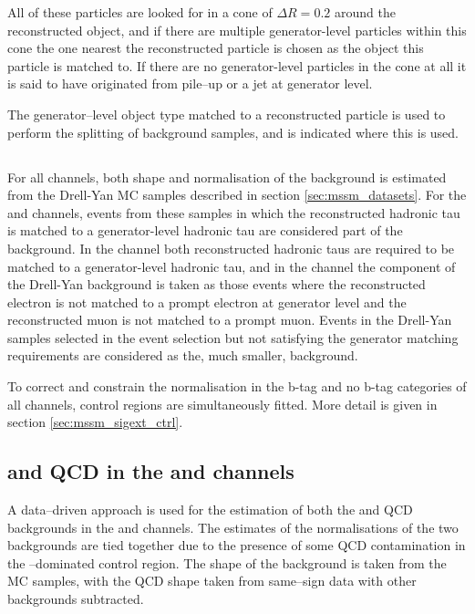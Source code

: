 All of these particles are looked for in a cone of $\Delta R = 0.2$ around
the reconstructed object, and if there are multiple generator-level
particles within this cone the one nearest the reconstructed particle
is chosen as the object this particle is matched to. If there are no 
generator-level particles in the cone at all it is said to 
have originated from pile--up or a jet at generator level.

The generator--level object type matched to a 
reconstructed particle is used to perform the splitting
of background samples, and is indicated where this is used.


\subsection{\texorpdfstring{\Ztautau}{Z to tau tau}}
\label{sec:mssm_bkgs_ztt}
For all channels, both shape and normalisation of the \Ztautau background 
is estimated from the Drell-Yan
\ac{MC} samples described in section \ref{sec:mssm_datasets}.
For the \mutau and \etau channels, events from these samples 
in which the reconstructed hadronic tau is matched to 
a generator-level hadronic tau are considered part of the \Ztautau
background. In the \tautau channel both reconstructed
hadronic taus are required to be matched to a generator-level hadronic tau, and
in the \emu channel the \Ztautau component of the Drell-Yan background 
is taken as those events where the reconstructed electron is not matched to
a prompt electron at generator level and the reconstructed
muon is not matched to a prompt muon. 
Events in the Drell-Yan samples selected in the event selection
but not satisfying the generator matching requirements are considered
as the, much smaller, \Zll background.

To correct and constrain the \Ztautau normalisation in the
b-tag and no b-tag categories of all channels, \Zmm control
regions are simultaneously fitted. More detail is given in 
section \ref{sec:mssm_sigext_ctrl}.

\subsection{\texorpdfstring{\Wjets and QCD in the \etau and \mutau channels}{W+jets and QCD in the e tau and mu tau channels}}
\label{sec:mssm_bkgs_mtet_wjetsqcd}
A data--driven approach is used for the estimation of
both the \Wjets and QCD backgrounds in the \etau and \mutau channels. 
The estimates of the normalisations of the two backgrounds are tied
together due to the presence of some QCD contamination in the \Wjets--dominated
control region. The shape of the \Wjets background is taken
from the \ac{MC} samples, with the QCD shape taken from same--sign
data with other backgrounds subtracted.

